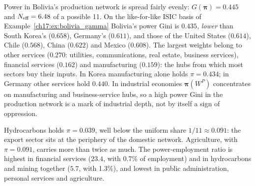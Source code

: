 \documentclass[../structural_economics_book.tex]{subfiles}
\begin{document}
\begin{example}
Power in Bolivia's production network is spread fairly evenly: $G(\boldsymbol{\pi}) = 0.445$ and $N_{\text{eff}} = 6.48$ of a possible 11. On the like-for-like ISIC basis of Example~\ref{ch17:ex:bolivia_gamma} Bolivia's power Gini is $0.435$, \emph{lower} than South Korea's ($0.658$), Germany's ($0.611$), and those of the United States ($0.614$), Chile ($0.568$), China ($0.622$) and Mexico ($0.608$). The largest weights belong to other services ($0.270$: utilities, communications, real estate, business services), financial services ($0.162$) and manufacturing ($0.159$): the hubs from which most sectors buy their inputs. In Korea manufacturing alone holds $\pi = 0.434$; in Germany other services hold $0.440$. In industrial economies $\boldsymbol{\pi}(W^P)$ concentrates on manufacturing and business-service hubs, so a high power Gini in the production network is a mark of industrial depth, not by itself a sign of oppression.

Hydrocarbons holds $\pi = 0.039$, well below the uniform share $1/11 \approx 0.091$: the export sector sits at the periphery of the domestic network. Agriculture, with $\pi = 0.091$, carries more than twice as much. The power-employment ratio is highest in financial services ($23.4$, with 0.7\% of employment) and in hydrocarbons and mining together ($5.7$, with 1.3\%), and lowest in public administration, personal services and agriculture.
\end{example}
\end{document}
